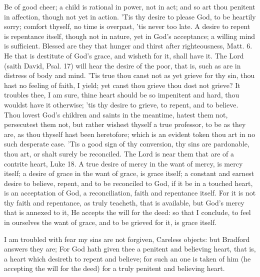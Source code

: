 {Be of good cheer; a child is rational in power, not in act; and so art
thou penitent in affection, though not yet in action. 'Tis thy desire
to please God, to be heartily sorry; comfort thyself, no time is
overpast, 'tis never too late. A desire to repent is repentance itself,
though not in nature, yet in God's acceptance; a willing mind is
sufficient. Blessed are they that hunger and thirst after
righteousness, Matt.  6. He that is destitute of God's grace, and
wisheth for it, shall have it. The Lord (saith David, Psal.  17) will
hear the desire of the poor, that is, such as are in distress of body
and mind. 'Tis true thou canst not as yet grieve for thy sin, thou hast
no feeling of faith, I yield; yet canst thou grieve thou dost not
grieve? It troubles thee, I am sure, thine heart should be so
impenitent and hard, thou wouldst have it otherwise; 'tis thy desire to
grieve, to repent, and to believe. Thou lovest God's children and
saints in the meantime, hatest them not, persecutest them not, but
rather wishest thyself a true professor, to be as they are, as thou
thyself hast been heretofore; which is an evident token thou art in no
such desperate case. 'Tis a good sign of thy conversion, thy sins are
pardonable, thou art, or shalt surely be reconciled. The Lord is near
them that are of a contrite heart, Luke  18. A true desire of
mercy in the want of mercy, is mercy itself; a desire of grace in the
want of grace, is grace itself; a constant and earnest desire to
believe, repent, and to be reconciled to God, if it be in a touched
heart, is an acceptation of God, a reconciliation, faith and repentance
itself. For it is not thy faith and repentance, as \Chrysostom{}
truly teacheth, that is available, but God's mercy that is annexed to
it, He accepts the will for the deed: so that I conclude, to feel in
ourselves the want of grace, and to be grieved for it, is grace itself.

I am troubled with fear my sins are not forgiven, Careless objects: but
Bradford answers they are; For God hath given thee a penitent and
believing heart, that is, a heart which desireth to repent and believe;
for such an one is taken of him (he accepting the will for the deed)
for a truly penitent and believing heart.

}
